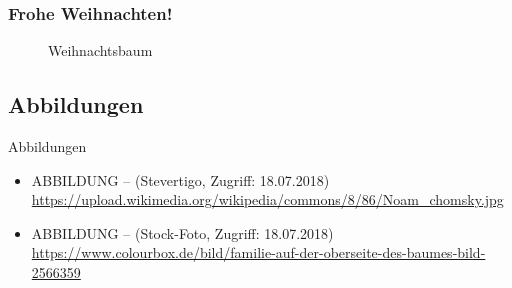 \begin{frame}
\frametitle{Frohe Weihnachten!}

\begin{figure}
\centering
{}
\caption{Weihnachtsbaum}
\end{figure}

\end{frame}


\subsection{Abbildungen}
\begin{frame}{Abbildungen}
\small

\begin{itemize}
	\item ABBILDUNG --  (Stevertigo, Zugriff: 18.07.2018) \url{https://upload.wikimedia.org/wikipedia/commons/8/86/Noam_chomsky.jpg}
	\item ABBILDUNG --  (Stock-Foto, Zugriff: 18.07.2018) \url{https://www.colourbox.de/bild/familie-auf-der-oberseite-des-baumes-bild-2566359}
\end{itemize}	

\end{frame}
